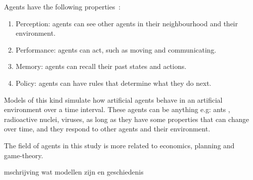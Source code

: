 Agents have the following properties~\cite{hamill2016agent}:
\begin{enumerate}
  \item Perception: agents can see other agents in their neighbourhood and their environment.
  \item Performance: agents can act, such as moving and communicating.
  \item Memory: agents can recall their past states and actions.
  \item Policy: agents can have rules that determine what they do next.
\end{enumerate}


Models of this kind simulate how artificial agents behave in an artificial environment over a time interval.
These agents can be anything e.g: ants , radioactive nuclei, viruses, as long as they have some properties that can change over time, and they respond to other agents and their environment.

The field of agents in this study is more related to economics, planning and game-theory.



mschrijving wat modellen zijn en geschiedenis



